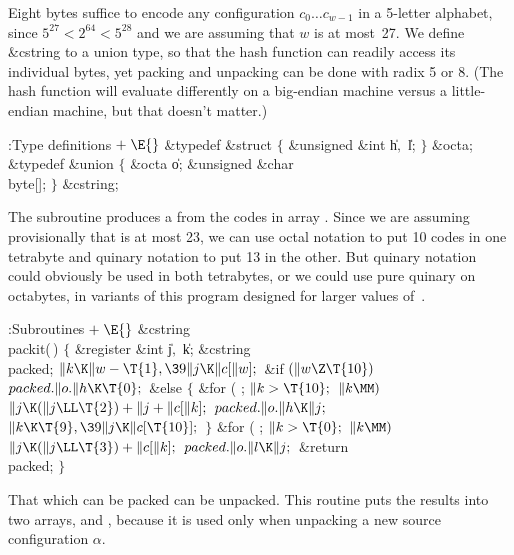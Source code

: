 \fi

Eight bytes suffice to encode any configuration $c_0\ldots
c_{w-1}$ in a
5-letter alphabet, since $5^{27}<2^{64}<5^{28}$ and we are assuming that $w$ is
at most~27. We define \&{cstring} to a union type, so that the hash function
can readily access its individual bytes, yet packing and unpacking can be done
with radix 5 or 8. (The hash function will evaluate differently on a
big-endian machine versus a little-endian machine, but that doesn't matter.)

\Y\B\4:Type definitions\X${}\mathrel+\E{}$\6
\&{typedef} \&{struct} ${}\{{}$\1\6
\&{unsigned} \&{int} \|h${},{}$ \|l;\2\6
${}\}{}$ \&{octa};\6
\&{typedef} \&{union} ${}\{{}$\1\6
\&{octa} \|o;\6
\&{unsigned} \&{char} \\{byte}[];\2\6
${}\}{}$ \&{cstring};\par
\fi

The  subroutine produces a 
from the codes in array .
Since we are assuming provisionally that  is at most 23, we can use
octal notation to put 10 codes in one tetrabyte and quinary notation
to put 13 in the other.
But quinary notation could obviously be used in both tetrabytes, or we
could use pure quinary on octabytes, in variants of
this program designed for larger values of~.

\Y\B\4:Subroutines\X${}\mathrel+\E{}$\6
\&{cstring} \\{packit}(\,)\1\1\2\2\6
${}\{{}$\1\6
\&{register} \&{int} \|j${},{}$ \|k;\6
\&{cstring} \\{packed};\7
${}\|k\K\|w-\T{1},\39\|j\K\|c[\|w];{}$\6
\&{if} ${}(\|w\Z\T{10}){}$\1\5
${}\\{packed}.\|o.\|h\K\T{0};{}$\2\6
\&{else}\5
${}\{{}$\1\6
\&{for} ( ; ${}\|k>\T{10};{}$ ${}\|k\MM){}$\1\5
${}\|j\K(\|j\LL\T{2})+\|j+\|c[\|k];{}$\2\6
${}\\{packed}.\|o.\|h\K\|j;{}$\6
${}\|k\K\T{9},\39\|j\K\|c[\T{10}];{}$\6
\4${}\}{}$\2\6
\&{for} ( ; ${}\|k>\T{0};{}$ ${}\|k\MM){}$\1\5
${}\|j\K(\|j\LL\T{3})+\|c[\|k];{}$\2\6
${}\\{packed}.\|o.\|l\K\|j;{}$\6
\&{return} \\{packed};\6
\4${}\}{}$\2\par
\fi

That which can be packed can be unpacked. This routine
puts the
results into two arrays,  and , because it is used only when
unpacking a new source configuration $\alpha$.

